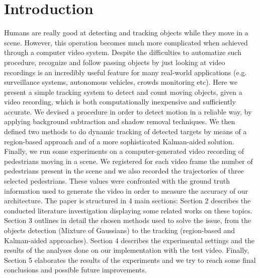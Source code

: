 \documentclass[runningheads]{llncs}
\begin{document}
\section{Introduction}
Humans are really good at detecting and tracking objects while they move in a scene. However, this operation becomes much more complicated when achieved through a computer video system. Despite the difficulties to automatize such procedure, recognize and follow passing objects by just looking at video recordings is an incredibly useful feature for many real-world applications (e.g. surveillance systems, autonomous vehicles, crowds monitoring etc). Here we present a simple tracking system to detect and count moving objects, given a video recording, which is both computationally inexpensive and sufficiently accurate.  We devised a procedure in order to detect motion in a reliable way, by applying background subtraction and shadow removal techniques. We then defined two methods to do dynamic tracking of detected targets by means of a region-based approach and of a more sophisticated Kalman-aided solution. Finally, we run some experiments on a computer-generated video recording of pedestrians moving in a scene. We registered for each video frame the number of pedestrians present in the scene and we also recorded the trajectories of three selected pedestrians. These values were confronted with the ground truth information used to generate the video in order to measure the accuracy of our architecture. 
The paper is structured in 4 main sections: Section 2 describes the conducted literature investigation displaying some related works on these topics. Section 3 outlines in detail the chosen methods used to solve the issue, from the objects detection (Mixture of Gaussians) to the tracking (region-based and Kalman-aided approaches). Section 4 describes the experimental settings and the results of the analyses done on our implementation with the test video. Finally, Section 5 elaborates the results of the experiments and we try to reach some final conclusions and possible future improvements.
\end{document}
